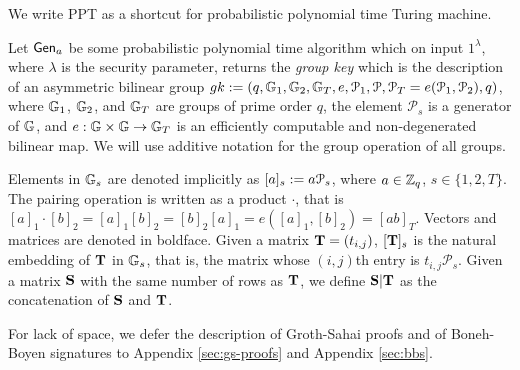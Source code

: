 
We write PPT as a shortcut for probabilistic polynomial time Turing machine.

Let $\mathsf{Gen}_a$ be some probabilistic polynomial time algorithm which on input $1^{\lambda}$, where $\lambda$ is the security parameter, returns the \emph{group key} which is the description of an asymmetric bilinear group $gk:=(q,\mathbb{G}_1,\mathbb{G}_2,\mathbb{G}_T,e,\mathcal{P}_1,\mathcal{P},\mathcal{P}_T=e(\mathcal{P}_1,\mathcal{P}_2),q)$, where $\mathbb{G}_1$, $\mathbb{G}_2$,
and $\mathbb{G}_T$ are groups of prime order $q$, the element $\mathcal{P}_s$ is a generator of 
$\mathbb{G}$, and $e:\mathbb{G}\times\mathbb{G}\to\mathbb{G}_T$ is an efficiently computable and non-degenerated bilinear map. We will use additive notation for the group operation of all groups.

Elements in $\mathbb{G}_s$ are denoted implicitly as $[a]_s:=a \mathcal{P}_s$, where $a\in\mathbb{Z}_q$, $s\in\{1,2,T\}$. 
The pairing operation is written as a product $\cdot$, that is $[a]_1 \cdot [b]_2 = [a]_1 [b]_2= [b]_2[a]_1=e([a]_1,[b]_2)=[ab]_T$. Vectors and matrices are denoted in boldface. Given a matrix $\mathbf{{T}}=(t_{i,j})$, $[\mathbf{{T}}]_s$ is
the natural embedding of $\mathbf{{T}}$ in $\mathbb{G}_s$, that is, the matrix whose $(i,j)$th entry is $t_{i,j}\mathcal{P}_s$. Given a matrix $\mathbf{{S}}$ with the same number of rows as $\mathbf{{T}}$, we define $\mathbf{{S}}|\mathbf{{T}}$ as the concatenation of $\mathbf{{S}}$ and $\mathbf{{T}}$.

For lack of space, we defer the description of Groth-Sahai proofs and of Boneh-Boyen signatures to Appendix \ref{sec:gs-proofs} and Appendix \ref{sec:bbs}.